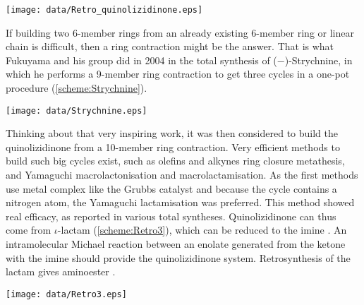 \begin{figure''}
\centering
		\texttt{[image: data/Retro\_quinolizidinone.eps]}		
    \label{scheme:Retro_quinolizidinone}
\end{figure''}
If building two 6-member rings from an already existing 6-member ring or linear chain is difficult, then a ring contraction might be the answer. That is what Fukuyama and his group did in 2004 in the total synthesis of ($-$)-Strychnine\autocite{Fukuyama04}, in which he performs a 9-member ring contraction to get three cycles in a one-pot procedure (\ref{scheme:Strychnine}). 
\begin{figure''}
\centering
	\texttt{[image: data/Strychnine.eps]}	
    \label{scheme:Strychnine}
\end{figure''}
Thinking about that very inspiring work, it was then considered to build the quinolizidinone from a 10-member ring contraction. Very efficient methods to build such big cycles exist, such as olefins and alkynes ring closure metathesis, and Yamaguchi macrolactonisation and macrolactamisation. As the first methods use metal complex like the Grubbs catalyst and because the cycle contains a nitrogen atom, the Yamaguchi lactamisation was preferred. This method showed real efficacy, as reported in various total syntheses\autocites{Zhu99}{Sih98}. Quinolizidinone  can thus come from $\iota$-lactam  (\ref{scheme:Retro3}), which can be reduced to the imine . An intramolecular Michael reaction between an enolate generated from the ketone with the imine should provide the quinolizidinone system. Retrosynthesis of the lactam gives aminoester .
\begin{figure''}
\centering
		\texttt{[image: data/Retro3.eps]}	
    \label{scheme:Retro3}
\end{figure''}
